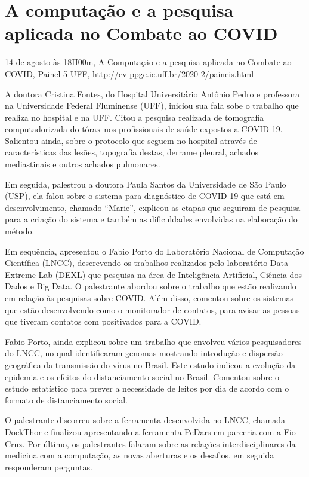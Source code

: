 \section{A computação e a pesquisa aplicada no Combate ao COVID}

\begin{center}
  \vspace{1cm}
  14 de agosto às 18H00m, A Computação e a pesquisa aplicada no Combate ao COVID, Painel 5 UFF, http://ev-ppgc.ic.uff.br/2020-2/paineis.html
  \vspace{1cm}
\end{center}

A doutora Cristina Fontes, do Hospital Universitário Antônio Pedro e professora na Universidade Federal Fluminense (UFF), iniciou sua fala sobe o trabalho que realiza no hospital e na UFF. Citou a pesquisa realizada de tomografia computadorizada do tórax nos profissionais de saúde expostos a COVID-19. Salientou ainda, sobre o protocolo que seguem no hospital através de características das lesões, topografia destas, derrame pleural, achados mediastinais e outros achados pulmonares.

Em seguida, palestrou a doutora Paula Santos da Universidade de São Paulo (USP), ela falou sobre o sistema para diagnóstico de COVID-19 que está em desenvolvimento, chamado “Marie”, explicou as etapas que seguiram de pesquisa para a criação do sistema e também as dificuldades envolvidas na elaboração do método. 

Em sequência, apresentou o Fabio Porto do Laboratório Nacional de Computação Científica (LNCC), descrevendo os trabalhos realizados pelo laboratório Data Extreme Lab (DEXL) que pesquisa na área de Inteligência Artificial, Ciência dos Dados e Big Data. O palestrante abordou sobre o trabalho que estão realizando em relação às pesquisas sobre COVID. Além disso, comentou sobre os sistemas que estão desenvolvendo como o monitorador de contatos, para avisar as pessoas que tiveram contatos com positivados para a COVID.

Fabio Porto, ainda explicou sobre um trabalho que envolveu vários pesquisadores do LNCC, no qual identificaram genomas mostrando introdução e dispersão geográfica da transmissão do vírus no Brasil. Este estudo indicou a evolução da epidemia e os efeitos do distanciamento social no Brasil. Comentou sobre o estudo estatístico para prever a necessidade de leitos por dia de acordo com o formato de distanciamento social.

O palestrante discorreu sobre a ferramenta desenvolvida no LNCC, chamada DockThor e finalizou apresentando a ferramenta PcDars em parceria com a Fio Cruz. 
Por último, os palestrantes falaram sobre as relações interdisciplinares da medicina com a computação, as novas aberturas e os desafios, em seguida responderam perguntas.
